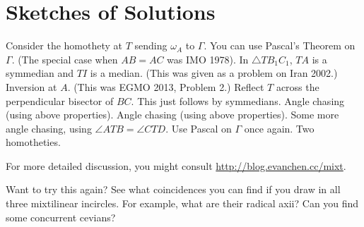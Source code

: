 \documentclass[11pt]{scrartcl}
\begin{document}
\section{Sketches of Solutions}
\begin{enumerate}
  \ii Consider the homothety at $T$ sending $\omega_A$ to $\Gamma$.
  \ii You can use Pascal's Theorem on $\Gamma$.
  (The special case when $AB=AC$ was IMO 1978).
  \ii In $\triangle TB_1C_1$, $TA$ is a symmedian and $TI$ is a median.
  (This was given as a problem on Iran 2002.)
  \ii Inversion at $A$. (This was EGMO 2013, Problem 2.)
  \ii Reflect $T$ across the perpendicular bisector of $BC$.
  \ii This just follows by symmedians.
  \ii Angle chasing (using above properties).
  \ii Angle chasing (using above properties).
  \ii Some more angle chasing, using $\angle ATB = \angle CTD$.
  \ii Use Pascal on $\Gamma$ once again.
  \ii Two homotheties.
\end{enumerate}
For more detailed discussion,
you might consult \url{http://blog.evanchen.cc/mixt}.

\vspace{2em}
Want to try this again?
See what coincidences you can find if you draw in all three mixtilinear incircles.
For example, what are their radical axii?
Can you find some concurrent cevians?
\end{document}
